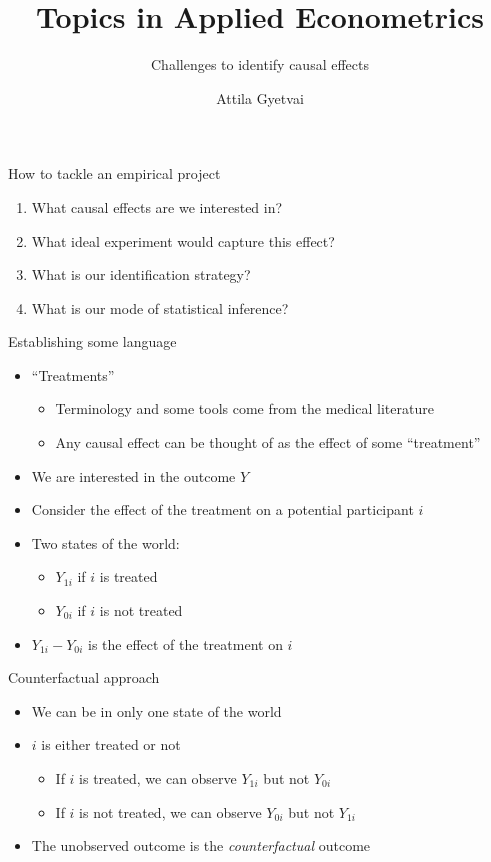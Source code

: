 \documentclass[aspectratio=169,compress,handout,t,xcolor=table]{beamer}
\title{Topics in Applied Econometrics}
\subtitle[]{Challenges to identify causal effects}
\author[Attila Gyetvai]{Attila Gyetvai}
\institute[]{Duke Economics \\ Summer 2020}
\date{}
\begin{document}
{
\begin{frame}
  \titlepage
\end{frame}
}
\addtocounter{framenumber}{-1}

\begin{frame}[c]{How to tackle an empirical project}
  \begin{enumerate}
    \addtolength{\itemsep}{0.5\baselineskip}
    \item What causal effects are we interested in?
    \item What ideal experiment would capture this effect?
    \item What is our identification strategy?
    \item What is our mode of statistical inference?
  \end{enumerate}
\end{frame}

\begin{frame}{Establishing some language}
  \begin{itemize}
    \item ``Treatments''
    \begin{itemize}
      \item Terminology and some tools come from the medical literature
      \item Any causal effect can be thought of as the effect of some ``treatment''
    \end{itemize}
    \item We are interested in the outcome \(Y\)
    \item Consider the effect of the treatment on a potential participant \(i\)
    \item Two states of the world:
    \begin{itemize}
      \item \(Y_{1i}\) if \(i\) is treated
      \item \(Y_{0i}\) if \(i\) is not treated
    \end{itemize}
    \item \(Y_{1i} - Y_{0i}\) is the effect of the treatment on \(i\)
  \end{itemize}
\end{frame}

\begin{frame}{Counterfactual approach}
  \begin{itemize}
    \item We can be in only one state of the world
    \item \(i\) is either treated or not
    \begin{itemize}
      \item If \(i\) is treated, we can observe \(Y_{1i}\) but not \(Y_{0i}\)
      \item If \(i\) is not treated, we can observe \(Y_{0i}\) but not \(Y_{1i}\)
    \end{itemize}
    \item The unobserved outcome is the \emph{counterfactual} outcome
  \end{itemize}
\end{frame}
\end{document}
